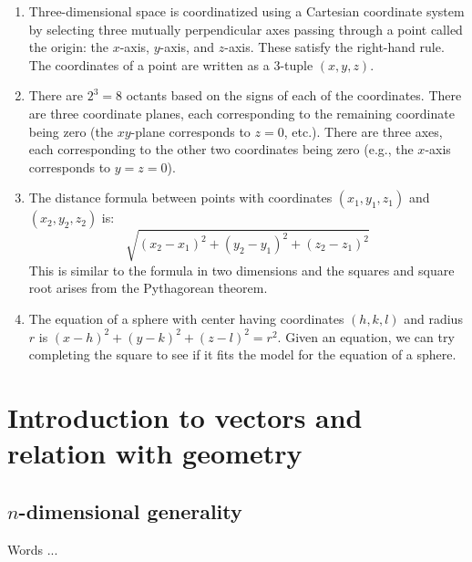 \documentclass[10pt]{amsart}
\begin{document}
\begin{enumerate}
\item Three-dimensional space is coordinatized using a Cartesian
  coordinate system by selecting three mutually perpendicular axes
  passing through a point called the origin: the $x$-axis, $y$-axis,
  and $z$-axis. These satisfy the right-hand rule. The coordinates of
  a point are written as a $3$-tuple $(x,y,z)$.
\item There are $2^3 = 8$ octants based on the signs of each of the
  coordinates. There are three coordinate planes, each corresponding
  to the remaining coordinate being zero (the $xy$-plane corresponds
  to $z = 0$, etc.). There are three axes, each corresponding to the
  other two coordinates being zero (e.g., the $x$-axis corresponds to
  $y = z = 0$).
\item The distance formula between points with coordinates
  $(x_1,y_1,z_1)$ and $(x_2,y_2,z_2)$ is: $$\sqrt{(x_2 - x_1)^2 + (y_2
  - y_1)^2 + (z_2 - z_1)^2}$$ This is similar to the formula in two
  dimensions and the squares and square root arises from the
  Pythagorean theorem.
\item The equation of a sphere with center having coordinates
  $(h,k,l)$ and radius $r$ is $(x - h)^2 + (y - k)^2 + (z - l)^2 =
  r^2$. Given an equation, we can try completing the square to see if
  it fits the model for the equation of a sphere.
\end{enumerate}

\section{Introduction to vectors and relation with geometry}

\subsection{$n$-dimensional generality}

Words ...
\end{document}
